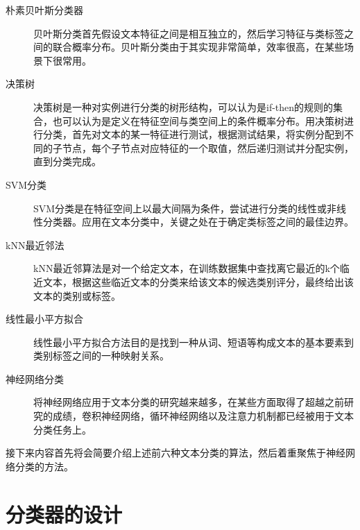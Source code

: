 \documentclass[UTF8]{ctexart}
\begin{document}
	\begin{description}
		\item[朴素贝叶斯分类器]贝叶斯分类首先假设文本特征之间是相互独立的，然后学习特征与类标签之间的联合概率分布。贝叶斯分类由于其实现非常简单，效率很高，在某些场景下很常用。
		\item[决策树]决策树是一种对实例进行分类的树形结构，可以认为是if-then的规则的集合，也可以认为是定义在特征空间与类空间上的条件概率分布。用决策树进行分类，首先对文本的某一特征进行测试，根据测试结果，将实例分配到不同的子节点，每个子节点对应特征的一个取值，然后递归测试并分配实例，直到分类完成。
		\item[SVM分类]SVM分类是在特征空间上以最大间隔为条件，尝试进行分类的线性或非线性分类器。应用在文本分类中，关键之处在于确定类标签之间的最佳边界。
		\item[kNN最近邻法] kNN最近邻算法是对一个给定文本，在训练数据集中查找离它最近的k个临近文本，根据这些临近文本的分类来给该文本的候选类别评分，最终给出该文本的类别或标签。
		\item[线性最小平方拟合] 线性最小平方拟合方法目的是找到一种从词、短语等构成文本的基本要素到类别标签之间的一种映射关系。
		\item[神经网络分类]将神经网络应用于文本分类的研究越来越多，在某些方面取得了超越之前研究的成绩，卷积神经网络，循环神经网络以及注意力机制都已经被用于文本分类任务上。
	\end{description}
	\par 接下来内容首先将会简要介绍上述前六种文本分类的算法，然后着重聚焦于神经网络分类的方法。
	
\section{分类器的设计}
\end{document}

